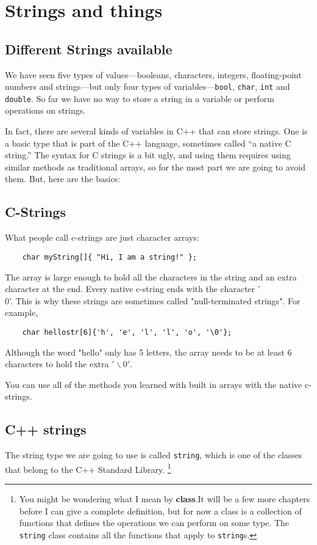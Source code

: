 


\chapter{Strings and things}
\label{strings}

\section{Different Strings available}

We have seen five types of values---booleans, characters, integers,
floating-point numbers and strings---but only four types of
variables---{\tt bool}, {\tt char}, {\tt int} and {\tt double}.  So
far we have no way to store a string in a variable or perform
operations on strings.

In fact, there are several kinds of variables in C++ that
can store strings.  One is a basic type that is part of the C++
language, sometimes called ``a native C string.''  The syntax
for C strings is a bit ugly, and using them requires using similar
methods as traditional arrays, so for the most part we are going to
avoid them. But, here are the basics:
\section{C-Strings}
What people call c-strings are just character arrays:
\begin{verbatim}
    char myString[]{ "Hi, I am a string!" };
\end{verbatim}
The array is large enough to hold all the characters in the string and an extra
character at the end. Every native c-string ends with the character '\\0'. This
is why these strings are sometimes called "null-terminated strings". For example,
\begin{verbatim}
    char hellostr[6]{'h', 'e', 'l', 'l', 'o', '\0'};
\end{verbatim}
Although the word "hello" only has 5 letters, the array needs to be at least 6 characters
to hold the extra $'\backslash 0'$.

You can
use all of the methods you learned with built in arrays with the native c-strings.
\section{C++ strings}
The string type we are going to use is called {\tt string}, which is
one of the classes that belong to the C++ Standard Library.
\footnote{You might be wondering what I mean by {\bf class}.It will be a few
more chapters before I can give a complete definition, but for now a
class is a collection of functions that defines the operations we
can perform on some type.  The {\tt string} class contains all
the functions that apply to {\tt string}s.}

